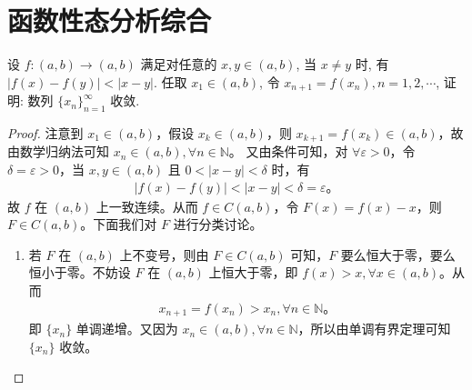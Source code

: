 \documentclass[../../main.tex]{subfiles}
\begin{document}
\section{函数性态分析综合}

\begin{proposition}
设 $f : (a, b) \to (a, b)$ 满足对任意的 $x, y \in (a, b)$, 当 $x \neq y$ 时, 有 $\left| f(x) - f(y) \right| < \left| x - y \right|$. 任取 $x_1 \in (a, b)$, 令 $x_{n+1} = f(x_n), n = 1, 2, \cdots$, 证明: 数列 $\{x_n\}_{n=1}^{\infty}$ 收敛.
\end{proposition}
\begin{proof}
注意到 $x_1 \in (a, b)$，假设 $x_k \in (a, b)$，则 $x_{k+1} = f(x_k) \in (a, b)$，故由数学归纳法可知 $x_n \in (a, b), \forall n \in \mathbb{N}$。
又由条件可知，对 $\forall \varepsilon > 0$，令 $\delta = \varepsilon > 0$，当 $x, y \in (a, b)$ 且 $0 < |x - y| < \delta$ 时，有
\begin{align*}
|f(x) - f(y)| < |x - y| < \delta = \varepsilon。
\end{align*}
故 $f$ 在 $(a, b)$ 上一致连续。从而 $f \in C(a, b)$，令 $F(x) = f(x) - x$，则 $F \in C(a, b)$。下面我们对 $F$ 进行分类讨论。

\begin{enumerate}[(1)]
\item 若 $F$ 在 $(a, b)$ 上不变号，则由 $F \in C(a, b)$ 可知，$F$ 要么恒大于零，要么恒小于零。不妨设 $F$ 在 $(a, b)$ 上恒大于零，即 $f(x) > x, \forall x \in (a, b)$。从而
\begin{align*}
x_{n+1} = f(x_n) > x_n, \forall n \in \mathbb{N}。
\end{align*}
即 $\{x_n\}$ 单调递增。又因为 $x_n \in (a, b), \forall n \in \mathbb{N}$，所以由单调有界定理可知 $\{x_n\}$ 收敛。


\end{enumerate}
\end{proof}
\end{document}
